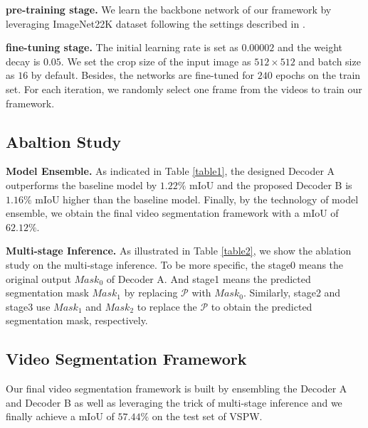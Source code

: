 \documentclass[10pt,twocolumn,letterpaper]{article}
\begin{document}
\noindent \textbf{pre-training stage.} We learn the backbone network of our framework by leveraging ImageNet22K dataset \cite{deng2009imagenet} following the settings described in \cite{bao2021beit}.

\noindent \textbf{fine-tuning stage.} The initial learning rate is set as $0.00002$ and the weight decay is $0.05$. 
We set the crop size of the input image as $512 \times 512$ and batch size as $16$ by default.
Besides, the networks are fine-tuned for $240$ epochs on the train set. For each iteration, we randomly select one frame from the videos to train our framework.





\subsection{Abaltion Study}
\noindent \textbf{Model Ensemble.} As indicated in Table \ref{table1}, the designed Decoder A outperforms the baseline model by $1.22\%$ mIoU and the proposed Decoder B is $1.16\%$ mIoU higher than the baseline model.
Finally, by the technology of model ensemble, we obtain the final video segmentation framework with a mIoU of $62.12\%$.

\noindent \textbf{Multi-stage Inference.}
As illustrated in Table \ref{table2}, we show the ablation study on the multi-stage inference. To be more specific, the stage0 means the original output $Mask_{0}$ of Decoder A. And stage1 means the predicted segmentation mask $Mask_{1}$ by replacing $\mathcal{P}$ with $Mask_{0}$.
Similarly, stage2 and stage3 use $Mask_{1}$ and $Mask_{2}$ to replace the $\mathcal{P}$ to obtain the predicted segmentation mask, respectively.

\subsection{Video Segmentation Framework}
Our final video segmentation framework is built by ensembling the Decoder A and Decoder B as well as leveraging the trick of multi-stage inference and we finally achieve a mIoU of $57.44\%$ on the test set of VSPW.


{\small


}
\end{document}
